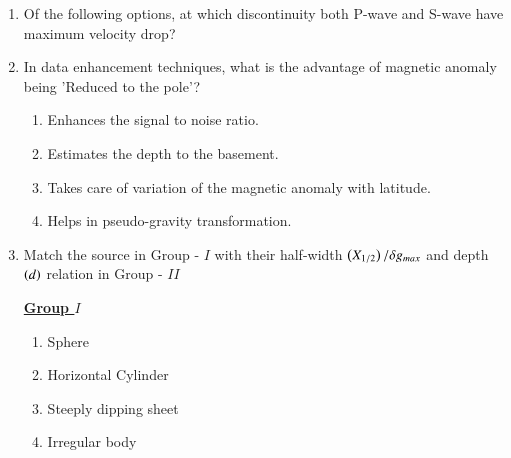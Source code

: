 \documentclass[journal,12pt,onecolumn]{IEEEtran}
\theoremstyle{remark}
\begin{document}
\begin{enumerate}
    \item Of the following options, at which discontinuity both P-wave and S-wave have maximum velocity drop? \hfill{}
                \begin{enumerate}
                \end{enumerate}
    
    \item In data enhancement techniques, what is the advantage of magnetic anomaly being 'Reduced to the pole'? \hfill{}
                \begin{enumerate}
                        \item Enhances the signal to noise ratio.
                        \item Estimates the depth to the basement.
                        \item Takes care of variation of the magnetic anomaly with latitude.
                        \item Helps in pseudo-gravity transformation.
                \end{enumerate}
    
    \item Match the source in Group - $I$ with their half-width $\left(X_{1/2}\right) / \delta g_{max}$ and depth $\left(d\right)$ relation in Group - $II$ \hfill{}
    
            \begin{multicols}{2}
                \underline{\textbf{Group $I$}}
                \begin{enumerate}[start =16]
                    \item Sphere
                    \item Horizontal Cylinder
                    \item Steeply dipping sheet
                    \item Irregular body
                \end{enumerate}
    
                \columnbreak
    

\end{multicols}
\end{enumerate}
\end{document}

